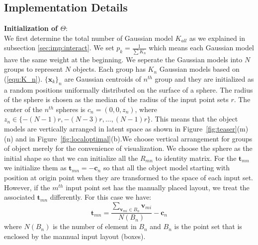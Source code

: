 \subsection{Implementation Details}
\textbf{Initialization of $\Theta$}:\\
We first determine the total number of Gaussian model $K_{all}$ as we explained in subsection \ref{sec:imp:interact}. We set $p_k=\frac{1}{\sum K_n}$ which means each Gaussian model have the same weight at the beginning. We seperate the Gaussian models into $N$ groups to represent $N$ objects. Each group has $K_n$ Gaussian models based on (\ref{equ:K_n}). $\{\pmb x_k\}_n$ are Gaussian centroids of $n^{th}$ group and they are initialized as a random positions uniformally distributed on the surface of a sphere. The radius of the sphere is chosen as the median of the radius of the input point sets $r$. The center of the $n^{th}$ spheres is $c_n=(0,0,z_n)$, where $z_n\in \{-(N-1)r,-(N-3)r,...,(N-1)r\}$. This means that the object models are vertically arranged in latent space as shown in Figure~\ref{fig:teaser}(m)(n) and in Figure~\ref{fig:localoptimal}(b).We choose vertical arrangement for groups of object merely for the convenience of visualization. We choose the sphere as the initial shape so that we can initialize all the $R_{mn}$ to identity matrix. For the $\pmb t_{mn}$ we initialize them as $\pmb t_{mn}=- \pmb c_n$ so that all the object model starting with position at origin point when they are transformed to the space of each input set. However, if the $m^{th}$ input point set has the manually placed layout, we treat the associated $\pmb t_{mn}$ differently. For this case we have:
\begin{equation}
\label{equ:initt}
\pmb t_{mn}=\frac{\sum_{\pmb v_{mi} \in B_n}\pmb v_{mi}}{N(B_n)}-\pmb c_n
\end{equation}
where $N(B_n)$ is the number of element in $B_n$ and $B_n$ is the point set that is enclosed by the mannual input layout (boxes). 
